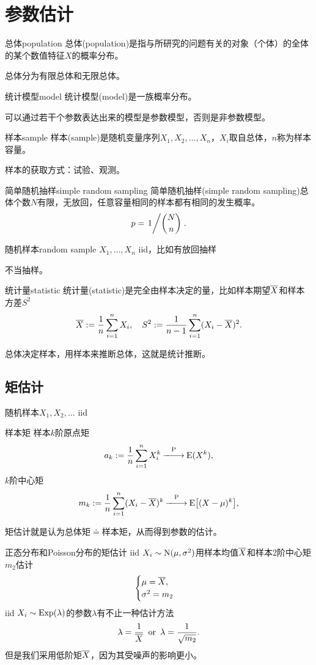 \chapter{参数估计}

\begin{definition}{总体}{population}
	总体(population)是指与所研究的问题有关的对象（个体）的全体的某个数值特征$X$的概率分布。
\end{definition}
总体分为有限总体和无限总体。
\begin{definition}{统计模型}{model}
	统计模型(model)是一族概率分布。
\end{definition}
可以通过若干个参数表达出来的模型是参数模型，否则是非参数模型。
\begin{definition}{样本}{sample}
	样本(sample)是随机变量序列$X_1,X_2,\ldots,X_n$，$X_i$取自总体，$n$称为样本容量。
\end{definition}
样本的获取方式：试验、观测。
\begin{definition}{简单随机抽样}{simple random sampling}
	简单随机抽样(simple random sampling)总体个数$N$有限，无放回，任意容量相同的样本都有相同的发生概率。
	\[
		p=\left.{1}\middle/{\binom Nn}\right..
	\]
\end{definition}
\begin{definition}{随机样本}{random sample}
	$X_1,\ldots,X_n$ iid，比如有放回抽样
\end{definition}
不当抽样。
\begin{definition}{统计量}{statistic}
	统计量(statistic)是完全由样本决定的量，比如样本期望$\overline{X}$和样本方差$S^2$
	\[
		\overline{X}:=\frac1n\sum_{i=1}^nX_i,\quad S^2:=\frac1{n-1}\sum_{i=1}^n(X_i-\overline{X})^2.
	\]
\end{definition}
总体决定样本，用样本来推断总体，这就是统计推断。
\section{矩估计}
随机样本$X_1,X_2,\ldots$ iid
\begin{definition}{样本矩}{}
	样本$k$阶原点矩
	\[
		a_k:=\frac1n\sum_{i=1}^nX_i^k\overset{\operatorname{P}}{-\hspace{-4pt}-\hspace{-5pt}\longrightarrow}\operatorname{E}(X^k),
	\]
	$k$阶中心矩
	\[
		m_k:=\frac1n\sum_{i=1}^n(X_i-\overline{X})^k\overset{\operatorname{P}}{-\hspace{-4pt}-\hspace{-5pt}\longrightarrow}\operatorname{E}\bigl[(X-\mu)^k\bigr],
	\]
\end{definition}
矩估计就是认为总体矩$\doteq$样本矩，从而得到参数的估计。
\begin{example}{正态分布和Poisson分布的矩估计}{}
	iid $X_i\sim\operatorname{N}(\mu,\sigma^2)$用样本均值$\overline{X}$和样本2阶中心矩$m_2$估计
	\begin{align*}
		\begin{cases}
			\mu=\overline{X},\\
			\sigma^2=m_2
		\end{cases}
	\end{align*}
	\tcblower
	iid $X_i\sim\operatorname{Exp}(\lambda)$的参数$\lambda$有不止一种估计方法
	\begin{align*}
		\lambda=\frac1{\overline{X}}\enspace\text{or}\enspace\lambda=\frac1{\sqrt{m_2}}.
	\end{align*}
	但是我们采用低阶矩$\overline{X}$，因为其受噪声的影响更小。
\end{example}
